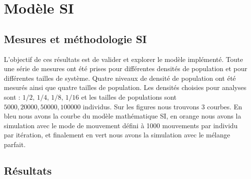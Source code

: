 \chapter{Modèle SI} \label{ch:SI}

\section{Mesures et méthodologie SI}

L'objectif de ces résultats est de valider et explorer le modèle implémenté. Toute une série de mesures ont été prises pour différentes densités de population et pour différentes tailles de système. Quatre niveaux de densité de population ont été mesurés ainsi que quatre tailles de population. Les densités choisies pour analyses sont : $1/2$, $1/4$, $1/8$, $1/16$ et les tailles de populations sont $5000,20000,50000,100000$ individus. Sur les figures nous trouvons $3$ courbes. En bleu nous avons la courbe du modèle mathématique SI, en orange nous avons la simulation avec le mode de mouvement défini à 1000 mouvements par individu par itération, et finalement en vert nous avons la simulation avec le mélange parfait.

\newpage

\section{Résultats}

